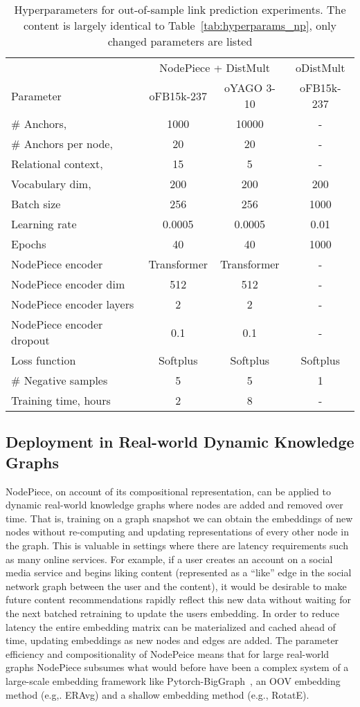 \documentclass{article} \usepackage{iclr2022_conference,times}
\begin{document}
\begin{table}[!h]
\centering
\caption{Hyperparameters for out-of-sample link prediction experiments. The content is largely identical to Table~\ref{tab:hyperparams_np}, only changed parameters are listed}
\label{tab:hparams_oos}
\begin{tabular}{@{}lccc@{}}
\toprule
& \multicolumn{2}{c}{NodePiece + DistMult} & \multicolumn{1}{c}{oDistMult} \\ \cmidrule(l){2-3} \cmidrule(l){4-4}
Parameter & oFB15k-237  & oYAGO 3-10 & oFB15k-237 \\ \midrule
\# Anchors,  & 1000 & 10000 & -  \\
\# Anchors per node,  & 20 & 20 & -  \\
Relational context,  & 15 & 5 & -  \\
Vocabulary dim,  & 200 & 200 & 200  \\
Batch size & 256 & 256 & 1000  \\
Learning rate & 0.0005 & 0.0005 & 0.01  \\
Epochs & 40 & 40 & 1000  \\
NodePiece encoder & Transformer & Transformer & -  \\
NodePiece encoder dim & 512 & 512 & -   \\
NodePiece encoder layers & 2 & 2 & -  \\
NodePiece encoder dropout & 0.1 & 0.1 & -  \\
Loss function & Softplus & Softplus & Softplus  \\
\# Negative samples & 5 & 5 & 1 \\  \midrule
Training time, hours & 2 & 8 & -  \\
\bottomrule
\end{tabular}
\end{table}
\subsection{Deployment in Real-world Dynamic Knowledge Graphs}
\label{app:inference}
NodePiece, on account of its compositional representation, can be applied to dynamic real-world knowledge graphs where nodes are added and removed over time. That is, training on a graph snapshot we can obtain the embeddings of new nodes without re-computing and updating representations of every other node in the graph. This is valuable in settings where there are latency requirements such as many online services. For example, if a user creates an account on a social media service and begins liking content (represented as a ``like''  edge in the social network graph between the user and the content), it would be desirable to make future content recommendations rapidly reflect this new data without waiting for the next batched retraining to update the users embedding.  In order to reduce latency the entire embedding matrix can be materialized and cached ahead of time, updating embeddings as new nodes and edges are added. The parameter efficiency and compositionality of NodePeice means that for large real-world graphs NodePiece subsumes what would before have been a complex system of a large-scale embedding framework like Pytorch-BigGraph~\citep{pbg}, an OOV embedding method (e.g,. ERAvg) and a shallow embedding method (e.g., RotatE). 
\end{document}

